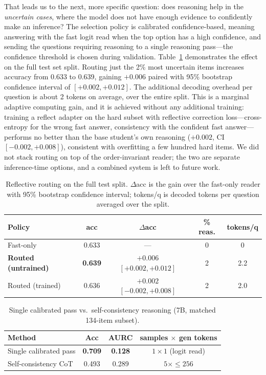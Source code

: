 \documentclass[conference]{IEEEtran}
\begin{document}
That leads us to the next, more specific question: does reasoning help in the \emph{uncertain cases}, where the model does not have enough evidence to confidently make an inference? The selection policy is calibrated confidence-based, meaning answering with the fast logit read when the top option has a high confidence, and sending the questions requiring reasoning to a single reasoning pass---the confidence threshold is chosen during validation. Table~\ref{tab:r3} demonstrates the effect on the full test set split. Routing just the 2\% most uncertain items increases accuracy from 0.633 to 0.639, gaining $+0.006$ paired with 95\% bootstrap confidence interval of $[+0.002,+0.012]$. The additional decoding overhead per question is about 2 tokens on average, over the entire split. This is a marginal adaptive computing gain, and it is achieved without any additional training: training a reflect adapter on the hard subset with reflective correction loss---cross-entropy for the wrong fast answer, consistency with the confident fast answer---performs no better than the base student's own reasoning ($+0.002$, CI $[-0.002,+0.008]$), consistent with overfitting a few hundred hard items. We did not stack routing on top of the order-invariant reader; the two are separate inference-time options, and a combined system is left to future work.

\begin{table}[tb]
\caption{Reflective routing on the full test split. $\Delta$acc is the gain over the fast-only reader with 95\% bootstrap confidence interval; tokens/q is decoded tokens per question averaged over the split.}\label{tab:r3}
\centering
\footnotesize
\setlength{\tabcolsep}{2pt}
\begin{tabular}{@{}lcccc@{}}
\toprule
Policy & acc & $\Delta$acc & \% reas. & tokens/q \\
\midrule
Fast-only & 0.633 & --- & 0 & 0 \\
\textbf{Routed (untrained)} & \textbf{0.639} & $\mathbf{+0.006}$ $[+0.002,+0.012]$ & 2 & 2.2 \\
Routed (trained) & 0.636 & $+0.002$ $[-0.002,+0.008]$ & 2 & 2.0 \\
\bottomrule
\end{tabular}
\end{table}

\begin{table}[tb]
\caption{Single calibrated pass vs.\ self-consistency reasoning (7B, matched 134-item subset).}\label{tab:sc}
\centering
\small
\setlength{\tabcolsep}{4pt}
\begin{tabular}{@{}lccc@{}}
\toprule
Method & Acc & AURC & samples $\times$ gen tokens \\
\midrule
Single calibrated pass & \textbf{0.709} & \textbf{0.128} & $1\times1$ (logit read) \\
Self-consistency CoT & 0.493 & 0.289 & $5\times{\le}256$ \\
\bottomrule
\end{tabular}
\end{table}
\end{document}

